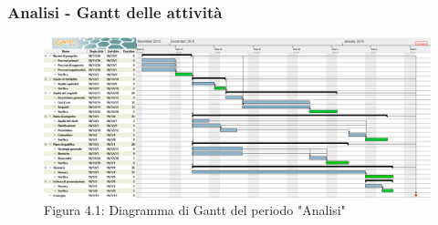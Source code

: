 \subsubsection{Analisi - Gantt delle attività}

\begin{figure} [H]
	\centering
	\includegraphics[scale=0.3]{Res/Gantt/Analisi}
	\caption{Figura 4.1: Diagramma di Gantt del periodo "Analisi"}\label{}
\end{figure}

\pagebreak
